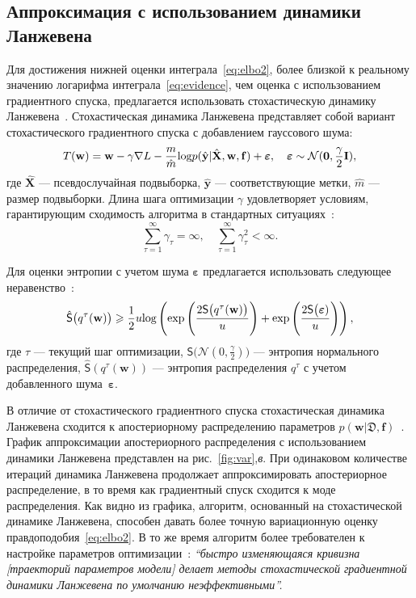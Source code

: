 \documentclass[12pt]{a&t}
\begin{document}
\subsection{Аппроксимация с использованием динамики Ланжевена}
Для достижения нижней оценки интеграла~\eqref{eq:elbo2}, более близкой к реальному значению логарифма интеграла~\eqref{eq:evidence}, чем оценка с использованием градиентного спуска, предлагается использовать стохастическую динамику Ланжевена~\cite{langevin}. Стохастическая динамика Ланжевена представляет собой вариант стохастического градиентного спуска с добавлением гауссового шума:
\begin{equation}
\label{eq:langevin}
	T(\mathbf{w}) = \mathbf{w} -  \gamma \nabla L -\frac{m}{\hat{m}}\textnormal{log}p(\hat{\mathbf{y}}|\hat{\mathbf{X}}, \mathbf{w},\mathbf{f}) + \boldsymbol{\varepsilon}, \quad  \boldsymbol{\varepsilon} \sim \mathcal{N}(\mathbf{0}, {\frac{\gamma}{2}}\mathbf{I}),
\end{equation}
где $\hat{\mathbf{X}}$ --- псевдослучайная подвыборка, $\hat{\mathbf{y}}$ --- соответствующие метки, $\hat{m}$ --- размер подвыборки. Длина шага оптимизации $\gamma$ удовлетворяет  {условиям, гарантирующим сходимость алгоритма в стандартных ситуациях~\cite{langevin}}:
\[
	\sum_{\tau=1}^\infty \gamma_\tau = \infty, \quad \sum_{\tau=1}^\infty \gamma_\tau^2 < \infty.
\]

Для оценки энтропии с учетом шума $\boldsymbol{\varepsilon}$ предлагается использовать следующее неравенство~\cite{entropy,var_grad}:
\[
\hat{\mathsf{S}}\bigl(q^\tau(\mathbf{w})\bigr)   \geq \frac{1}{2}u\textnormal{log}\left(\textnormal{exp}\left(\frac{2\mathsf{S}\bigl(q^\tau(\mathbf{w})\bigr)}{u}\right) + \textnormal{exp}\left(\frac{2\mathsf{S}\bigl( \boldsymbol{\varepsilon})}{u}\right)\right),
\]
{где  $\tau$ --- текущий шаг оптимизации,} $\mathsf{S}\bigl( \mathcal{N}({0}, {\frac{\gamma}{2}})\bigr)$ --- энтропия нормального распределения, $\hat{\mathsf{S}}(q^\tau(\mathbf{w}))$ --- энтропия распределения $q^\tau$ с учетом добавленного шума~$\boldsymbol{\varepsilon}$.


В отличие от стохастического градиентного спуска стохастическая динамика Ланжевена сходится к апостериорному распределению параметров $p(\mathbf{w}|\mathfrak{D},\mathbf{f})$~\cite{langevin, langevin_sato}.  График аппроксимации апостериорного распределения с использованием динамики Ланжевена представлен на рис.~\ref{fig:var},\textit{в}. При одинаковом количестве итераций динамика Ланжевена продолжает аппроксимировать апостериорное распределение, в то время как градиентный спуск сходится к моде распределения. {Как видно из графика, алгоритм, основанный на стохастической динамике Ланжевена, способен давать более точную вариационную оценку правдоподобия~\eqref{eq:elbo2}. В то же время алгоритм более требователен к настройке параметров оптимизации~\cite{lang_cond}: \textit{``быстро изменяющаяся кривизна [траекторий параметров модели] делает методы стохастической градиентной динамики Ланжевена по умолчанию неэффективными''.}}
\end{document}
